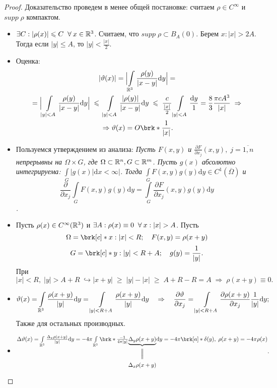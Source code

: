 \begin{proof}

Доказательство проведем в менее общей постановке: считаем $\rho \in C^\infty$ и $supp \;\rho$ компактом.

	\begin{itemize}
		\item $\exists C: |\rho (x)|\leqslant C \;\;\forall\:  x \in \mathbb{R}^3$. Считаем, что $supp \;\rho  \subset B_A(0)$. Берем $x: |x| > 2A$. Тогда если $|y| \leq A$, то $|y| < \frac{|x|}{2}$.
        \item Оценка:
        	\begin{multline*}
				\ |\vartheta (x)| = \Bigl | \int\limits_{\R^3} \frac{\rho (y)}{|x-y|}\mathrm{d}y \Bigr | = {}\\
                {} = \Bigl | \int\limits_{|y|<A} \frac{\rho (y)}{|x-y|}\mathrm{d}y \Bigr | \;\leq\; \int\limits_{|y|<A} \frac{|\rho (y)|}{|x-y|}\mathrm{d}y \;\leq\; \frac{c}{\frac{|x|}{2}}\int\limits_{|y|<A}\frac{\mathrm{d}y}{1} = \frac{8}{3}\frac{\pi c A^3}{|x|} \;\Rightarrow {}\\
                {} \Rightarrow \vartheta (x) = O \brk*{\frac{1}{|x|}}.
			\end{multline*}
        \item Пользуемся утверждением из анализа: {\it Пусть $F(x,y)$ и $\frac{\partial F}{\partial x_j}(x,y), \; j= \overline{1,n}$ непрерывны на $\Omega \times G$, где $\Omega \subset  \mathbb{R}^n, G \subset \mathbb{R}^m$. Пусть $g(x)$ абсолютно интегрируема: $\int\limits_G |g(x)| \mathrm{d}x < \infty|$. Тогда $\int\limits_G F(x,y)g(y) \mathrm{d}y \in C^1(\overline{\Omega})$ и
        $$
        \frac{\partial}{\partial x_j}\int\limits_G F(x,y)g(y)\mathrm{d}y = \int\limits_G \frac{\partial F}{\partial x_j}(x,y)g(y)\mathrm{d}y 
        $$.}
        \item Пусть $\rho (x) \in C^\infty (\mathbb{R}^3)$ и $\exists A: \rho (x) \equiv 0 \;\;\forall\: x: |x| > A$. Пусть 
        $$\Omega = \brk[c]*{x: |x| < R};\quad F(x,y) = \rho (x+y)$$
        $$G = \brk[c]*{y: |y| < R+A};\quad g(y) = \frac{1}{|y|}.$$
        При $|x| < R,\; |y| > A+R \; \hookrightarrow |x+y| \;\geq\; |y| - |x| \;\geq\; A+R -R = A \;\Rightarrow \; \rho (x+y) \equiv 0. $
        \item 
        $$
        \vartheta (x) = \int\limits_{\mathbb{R}^3}\frac{\rho (x+y)}{|y|}\mathrm{d} y = \int\limits_{|y| < R+A}\frac{\rho (x+y)}{|y|}\mathrm{d} y \quad \Rightarrow\quad \frac{\partial \vartheta}{\partial x_j} = \int\limits_{|y| < R+A}\frac{\partial \rho (x+y)}{\partial x_j}\frac{1}{|y|}\mathrm{d} y
        ;$$ Также для остальных производных.
        \item 
        $$
        \begin{CD}
          \Delta \vartheta (x) = \int\limits_{\R^3}\frac{\Delta_x \rho (x+y)}{|y|}\mathrm{d}y = -4\pi \int\limits_{\R^3}\brk*{\frac{-1}{4\pi |y|}} @. \underbrace{\Delta_y \rho (x+y)} @.\mathrm{d}y = -4\pi \brk[a]*{\delta(y),\; \rho (x+y)} = -4\pi \rho (x) \\
          @.   @|   @.\\
          @.   {\Delta_x \rho (x+y)}   @.
        \end{CD}
        .$$
	\end{itemize}

\end{proof}